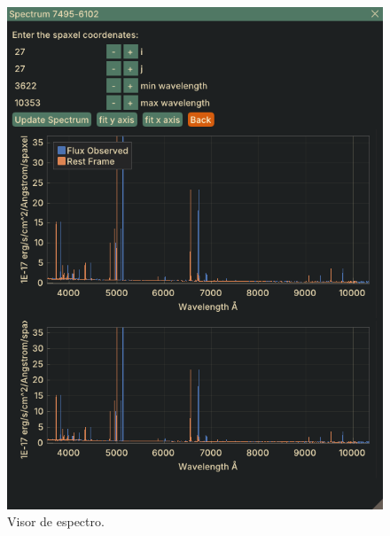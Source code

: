 \documentclass[9pt,twocolumn,a4paper]{opticajnl}
\begin{document}
\begin{figure}
    \centering
    \includegraphics[width=1\linewidth]{spectrum_visor.png}
    \caption{Visor de espectro.}
    \label{fig:spectrum_visor}
\end{figure}
\end{document}
